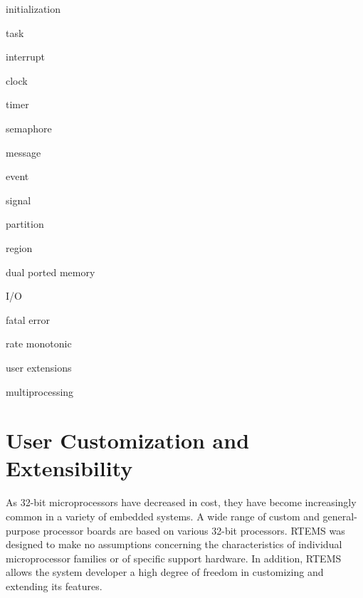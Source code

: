 \begin{DoxyItemize}
\item initialization
\item task
\item interrupt
\item clock
\item timer
\item semaphore
\item message
\item event
\item signal
\item partition
\item region
\item dual ported memory
\item I/O
\item fatal error
\item rate monotonic
\item user extensions
\item multiprocessing
\end{DoxyItemize}\hypertarget{RTEMSOverview_RTEMSOverviewSecUserCustomization}{}\section{User Customization and Extensibility}\label{RTEMSOverview_RTEMSOverviewSecUserCustomization}
As 32-\/bit microprocessors have decreased in cost, they have become increasingly common in a variety of embedded systems. A wide range of custom and general-\/purpose processor boards are based on various 32-\/bit processors. R\+T\+E\+MS was designed to make no assumptions concerning the characteristics of individual microprocessor families or of specific support hardware. In addition, R\+T\+E\+MS allows the system developer a high degree of freedom in customizing and extending its features.

